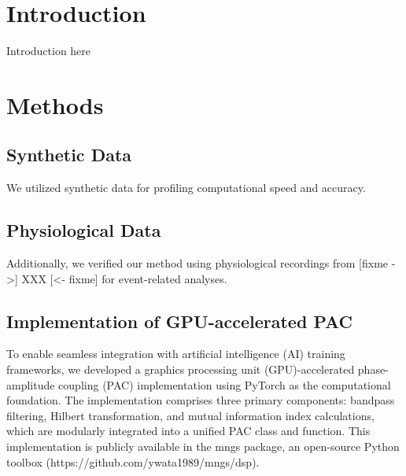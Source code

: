 \documentclass[preprint,review,12pt]{elsarticle}%
\begin{document}

\section{Introduction}
Introduction here

\label{sec:introduction}


\section{Methods}
\subsection{Synthetic Data}
We utilized synthetic data for profiling computational speed and accuracy.

\subsection{Physiological Data}
Additionally, we verified our method using physiological recordings from [fixme ->] XXX [<- fixme] for event-related analyses.


\subsection{Implementation of GPU-accelerated PAC}
To enable seamless integration with artificial intelligence (AI) training frameworks, we developed a graphics processing unit (GPU)-accelerated phase-amplitude coupling (PAC) implementation using PyTorch as the computational foundation. The implementation comprises three primary components: bandpass filtering, Hilbert transformation, and mutual information index calculations, which are modularly integrated into a unified PAC class and function. This implementation is publicly available in the mngs package, an open-source Python toolbox (https://github.com/ywata1989/mngs/dsp).
\end{document}
